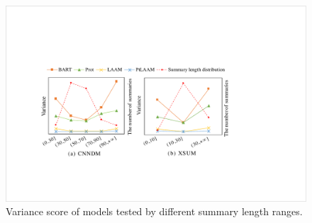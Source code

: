 \begin{figure}[!ht]
	\centering
	\scriptsize
	\includegraphics[width=1\linewidth]{vars.pdf}
	\caption{Variance score of models tested by different summary length ranges.}
	\label{fig:vars}
\end{figure}


